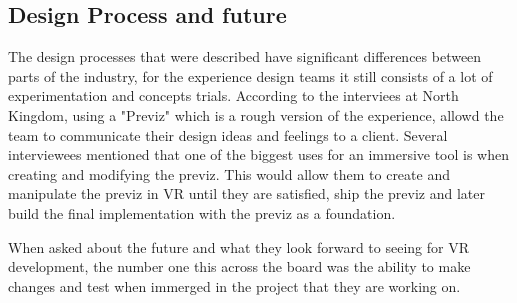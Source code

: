 \subsection{Design Process and future}
The design processes that were described have significant differences between parts of the industry, for the experience design teams it still consists of a lot of experimentation and concepts trials. According to the interviees at North Kingdom, using a "Previz" which is a rough version of the experience, allowd the team to communicate their design ideas and feelings to a client. Several interviewees mentioned that one of the biggest uses for an immersive tool is when creating and modifying the previz. This would allow them to create and manipulate the previz in VR until they are satisfied, ship the previz and later build the final implementation with the previz as a foundation.

When asked about the future and what they look forward to seeing for VR development, the number one this across the board was the ability to make changes and test when immerged in the project that they are working on.

